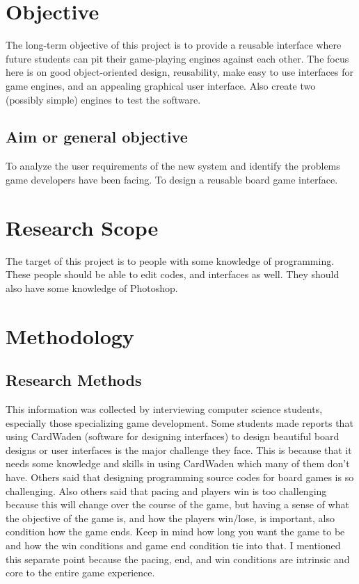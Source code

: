 \documentclass[a4paper,12pt]{article}
\begin{document}
\section{	Objective}
The long-term objective of this project is to provide a reusable interface where future students can pit their game-playing engines against each other. The focus here is on good object-oriented design, reusability, make easy to use interfaces for game engines, and an appealing graphical user interface. Also create two (possibly simple) engines to test the software.


\subsection{Aim or general objective}
To analyze the user requirements of the new system and identify the problems game developers have been facing. 
To design a reusable board game interface. 
\section{Research Scope}
The target of this project is to people with some knowledge of programming. 
These people should be able to edit codes, and interfaces as well. 
They should also have some knowledge of Photoshop.
	
\section{Methodology}
\subsection{Research Methods}
This information was collected by interviewing computer science students, especially those specializing game development. Some students made reports that using CardWaden (software for designing interfaces) to design beautiful board designs or user interfaces is the major challenge they face. This is because that it needs some knowledge and skills in using CardWaden which many of them don’t have. Others said that designing programming source codes for board games is so challenging.  Also others said that pacing and players win is too challenging because this will change over the course of the game, but having a sense of what the objective of the game is, and how the players win/lose, is important, also condition how the game ends. Keep in mind how long you want the game to be and how the win conditions and game end condition tie into that. I mentioned this separate point because the pacing, end, and win conditions are intrinsic and core to the entire game experience.
\begin{thebibliography}{1}
\end{thebibliography}
\end{document}
